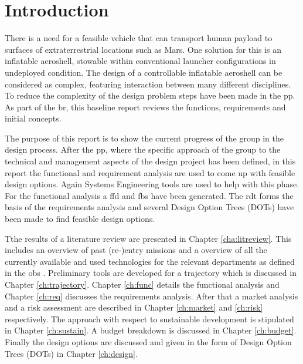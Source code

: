 \section{Introduction}\label{cha:introduction}
There is a need for a feasible vehicle that can transport human payload to surfaces of extraterrestrial locations such as Mars. One solution for this is an inflatable aeroshell, stowable within conventional launcher configurations in undeployed condition. The design of a controllable inflatable aeroshell can be considered as complex, featuring interaction between many different disciplines. To reduce the complexity of the design problem steps have been made in the \gls{pp}. As part of the \gls{br}, this baseline report reviews the functions, requirements and initial concepts.

The purpose of this report is to show the current progress of the group in the design process. After the \gls{pp}, where the specific approach of the group to the technical and management aspects of the design project has been defined, in this report the functional and requirement analysis are used to come up with feasible design options. Again Systems Engineering tools are used to help with this phase. For the functional analysis a \acrfull{ffd} and \acrfull{fbs} have been generated. The \acrfull{rdt} forms the basis of the requirements analysis and several Design Option Trees (DOTs) have been made to find feasible design options.

Tthe results of a literature review are presented in Chapter \ref{cha:litreview}. This includes an overview of past (re-)entry missions and a overview of all the currently available and used technologies for the relevant departments as defined in the \gls{obs} \cite{Balasooriyan2015}. Preliminary tools are developed for a trajectory which is discussed in Chapter \ref{ch:trajectory}. Chapter \ref{ch:func} details the functional analysis and Chapter \ref{ch:req} discusses the requirements analysis. After that a market analysis and a risk assessment are described in Chapter \ref{ch:market} and \ref{ch:risk} respectively. The approach with respect to sustainable development is stipulated in Chapter \ref{ch:sustain}.  A budget breakdown is discussed in Chapter \ref{ch:budget}. Finally the design options are discussed and given in the form of Design Option Trees (DOTs) in Chapter \ref{ch:design}. 



